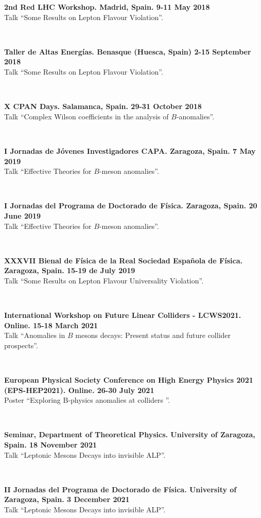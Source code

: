 \documentclass{cvf}
\begin{document}
\hspace{\parindent}\textbf{2nd Red LHC Workshop. Madrid, Spain. 9-11 May 2018}\\
Talk ``Some Results on Lepton Flavour Violation''.

~

\textbf{Taller de Altas Energías. Benasque (Huesca, Spain) 2-15 September 2018}\\
Talk ``Some Results on Lepton Flavour Violation''.

~

\textbf{X CPAN Days. Salamanca, Spain. 29-31 October 2018}\\
Talk ``Complex Wilson coefficients in the analysis of $B$-anomalies''.

~

\textbf{I Jornadas de Jóvenes Investigadores CAPA. Zaragoza, Spain. 7 May 2019}\\
Talk ``Effective Theories for $B$-meson anomalies''.

~

\textbf{I Jornadas del Programa de Doctorado de Física. Zaragoza, Spain. 20 June 2019}\\
Talk ``Effective Theories for $B$-meson anomalies''.

~

\textbf{XXXVII Bienal de Física de la Real Sociedad Española de Física. Zaragoza, Spain. 15-19 de July 2019}\\
Talk ``Some Results on Lepton Flavour Universality Violation''.

~

\textbf{International Workshop on Future Linear Colliders - LCWS2021. Online. 15-18 March 2021}\\
Talk ``Anomalies in $B$ mesons decays: Present status and future collider prospects''.

~

\textbf{European Physical Society Conference on High Energy Physics 2021 (EPS-HEP2021). Online. 26-30 July 2021}\\
Poster ``Exploring B-physics anomalies at colliders ''.

~

\textbf{Seminar, Department of Theoretical Physics. University of Zaragoza, Spain. 18 November 2021}\\
Talk ``Leptonic Mesons Decays into invisible ALP''.

~

\textbf{II Jornadas del Programa de Doctorado de Física. University of Zaragoza, Spain. 3 December 2021}\\
Talk ``Leptonic Mesons Decays into invisible ALP''.
\end{document}

